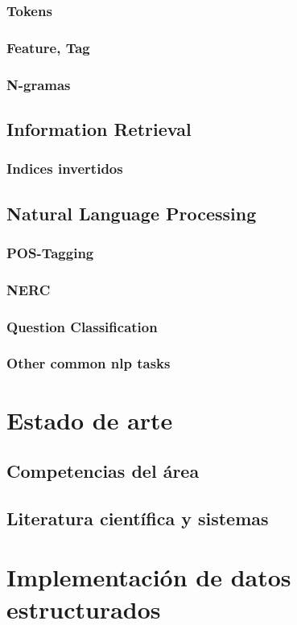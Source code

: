 \subsection{Tokens}
\subsection{Feature, Tag}
\subsection{N-gramas}
\section{Information Retrieval}
\subsection{Indices invertidos}
\section{Natural Language Processing}
\subsection{POS-Tagging}
\subsection{NERC}
\subsection{Question Classification}
\subsection{Other common nlp tasks}
\chapter{Estado de arte}
\section{Competencias del área}
\section{Literatura científica y sistemas}
\chapter{Implementación de datos estructurados}
